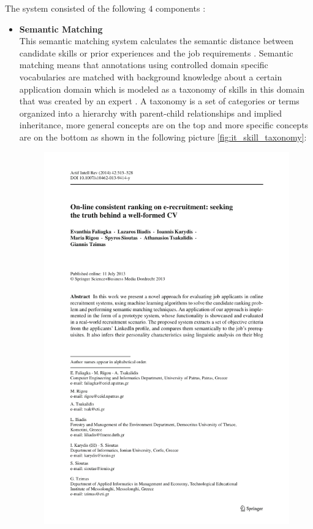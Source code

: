 \documentclass[draft,final]{thesisclass} %
\begin{document}
The system consisted of the following $4$ components \parencite[518-519]{applicant_semantic_matching}:
\begin{itemize}
    \item \textbf{Semantic Matching}\\
    This semantic matching system calculates the semantic distance between candidate skills or prior experiences and the job requirements \parencite[518]{applicant_semantic_matching}.
    Semantic matching means that annotations using controlled domain specific vocabularies are matched with background knowledge about a certain application domain which is modeled as a taxonomy of skills in this domain that was created by an expert \parencite[519]{applicant_semantic_matching}.
    A taxonomy is a set of categories or terms organized into a hierarchy with parent-child relationships and implied inheritance, more general concepts are on the top and more specific concepts are on the bottom as shown in the following picture \ref{fig:it_skill_taxonomy}:
    \begin{figure}[H]
        \centering
        \includegraphics[scale=1,page=5,width=0.8\linewidth,trim={45 510 45 55},clip]{literature/applicant_semantic_matching.pdf}

\end{figure}
\end{itemize}
\end{document}
